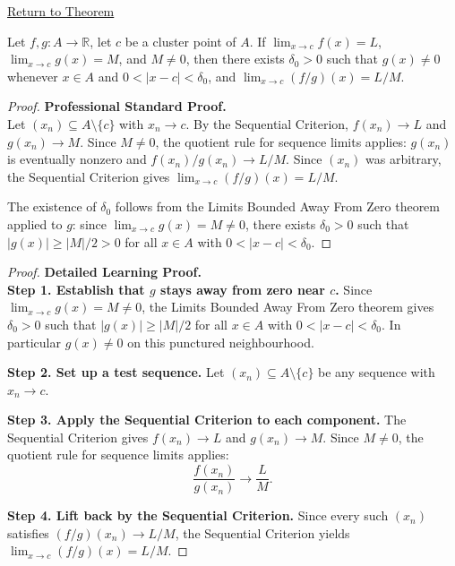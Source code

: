 \newpage
{}
\label{prf:limit-quotient}

\begin{remark*}[Return]
\hyperref[thm:limit-quotient]{Return to Theorem}
\end{remark*}

\begin{theorem*}
Let $f, g : A \to \mathbb{R}$, let $c$ be a cluster point of $A$. If
$\lim_{x\to c}f(x)=L$, $\lim_{x\to c}g(x)=M$, and $M \neq 0$, then there
exists $\delta_0 > 0$ such that $g(x) \neq 0$ whenever $x \in A$ and
$0 < |x-c| < \delta_0$, and $\lim_{x\to c}(f/g)(x) = L/M$.
\end{theorem*}

\begin{proof}
\textbf{Professional Standard Proof.}~\\
Let $(x_n) \subseteq A \setminus \{c\}$ with $x_n \to c$.
By the Sequential Criterion, $f(x_n) \to L$ and $g(x_n) \to M$.
Since $M \neq 0$, the quotient rule for sequence limits applies: $g(x_n)$
is eventually nonzero and $f(x_n)/g(x_n) \to L/M$.
Since $(x_n)$ was arbitrary, the Sequential Criterion gives
$\lim_{x\to c}(f/g)(x) = L/M$.

The existence of $\delta_0$ follows from the Limits Bounded Away From Zero
theorem applied to $g$: since $\lim_{x\to c}g(x)=M \neq 0$, there exists
$\delta_0 > 0$ such that $|g(x)| \geq |M|/2 > 0$ for all $x \in A$ with
$0 < |x-c| < \delta_0$.
\end{proof}

\begin{proof}
\textbf{Detailed Learning Proof.}~\\
\textbf{Step 1. Establish that $g$ stays away from zero near $c$.}
Since $\lim_{x\to c}g(x) = M \neq 0$, the Limits Bounded Away From Zero
theorem gives $\delta_0 > 0$ such that $|g(x)| \geq |M|/2$ for all
$x \in A$ with $0 < |x-c| < \delta_0$. In particular $g(x) \neq 0$
on this punctured neighbourhood.

\textbf{Step 2. Set up a test sequence.}
Let $(x_n) \subseteq A \setminus \{c\}$ be any sequence with $x_n \to c$.

\textbf{Step 3. Apply the Sequential Criterion to each component.}
The Sequential Criterion gives $f(x_n) \to L$ and $g(x_n) \to M$.
Since $M \neq 0$, the quotient rule for sequence limits applies:
\[
  \frac{f(x_n)}{g(x_n)} \to \frac{L}{M}.
\]

\textbf{Step 4. Lift back by the Sequential Criterion.}
Since every such $(x_n)$ satisfies $(f/g)(x_n) \to L/M$, the Sequential
Criterion yields $\lim_{x\to c}(f/g)(x) = L/M$.
\end{proof}

